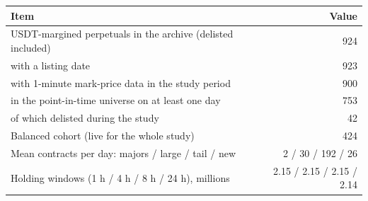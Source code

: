 \begin{tabular}{@{}lr@{}}
\toprule
Item & Value \\
\midrule
USDT-margined perpetuals in the archive (delisted included) & 924 \\
\quad with a listing date & 923 \\
\quad with 1-minute mark-price data in the study period & 900 \\
\quad in the point-in-time universe on at least one day & 753 \\
\quad of which delisted during the study & 42 \\
Balanced cohort (live for the whole study) & 424 \\
Mean contracts per day: majors / large / tail / new & 2 / 30 / 192 / 26 \\
Holding windows (1 h / 4 h / 8 h / 24 h), millions & 2.15 / 2.15 / 2.15 / 2.14 \\
\bottomrule
\end{tabular}
